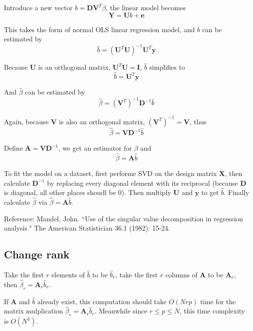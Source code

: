 \documentclass[12pt]{article}
\begin{document}
Introduce a new vector $b = \bm{D} \bm{V}^T \beta$, 
the linear model becomes \[ \bm{Y} = \bm{U} b + \bm{e} \]

This takes the form of normal OLS linear regression model, 
and $b$ can be estimated by
\[ \hat{b} = (\bm{U}^T \bm{U})^{-1} \bm{U}^T  \bm{y} \]

Because $\bm{U}$ is an orthogonal matrix, $\bm{U}^T \bm{U} = \bm{I}$,
$\hat{b}$ simplifies to
\[ \hat{b} = \bm{U}^T  \bm{y} \]

And $\hat{\beta}$ can be estimated by
\[\hat{\beta} = (\bm{V}^T)^{-1} \bm{D}^{-1} \hat{b} \]

Again, because $\bm{V}$ is also an orthogonal matrix, $(\bm{V}^T)^{-1} = \bm{V}$, thus
\[\hat{\beta} = \bm{V} \bm{D}^{-1} \hat{b} \]

Define $\bm{A}=\bm{V} \bm{D}^{-1}$, we get an estimator for $\beta$ and
\[ \hat{\beta} = \bm{A} \hat{b} \]

To fit the model on a dataset, first performe SVD on the design matrix $\bm{X}$,
then calculate $\bm{D}^{-1}$ by replacing every diagonal element with its reciprocal (because $\bm{D}$ is diagonal, all other places shoudl be 0). Then multiply $\bm{U}$ and $\bm{y}$ to get $\hat{b}$. Finally calculate $\hat{\beta}$ via $\hat{\beta} = \bm{A} \hat{b}$.

{\scriptsize Reference: Mandel, John. ``Use of the singular value decomposition in regression analysis." The American Statistician 36.1 (1982): 15-24.}


\subsection{Change rank}
Take the first $r$ elements of $\hat{b}$ to be $\hat{b}_r$,
take the first $r$ columns of $\bm{A}$ to be $\bm{A}_r$, 
then $\hat{\beta}_r = \bm{A}_r \hat{b}_r$.

If $\bm{A}$ and $\hat{b}$ already exist,
this computation should take $O(Nrp)$ time
for the matrix mulplication $\hat{\beta}_r = \bm{A}_r \hat{b}_r$. Meanwhile since $r \leq p \leq N$, this time complexity is $O(N^3)$.
	

 
 
\end{document}
